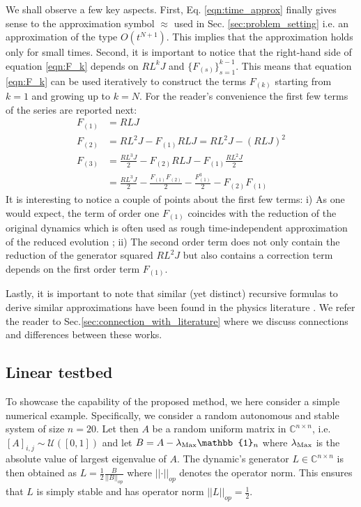 \documentclass[twocolumn]{autart}    %
\newcommand{\Uc}{\mathcal{U}}
\newcommand{\Cb}{\mathbb{C}}
\newcommand{\um}{\frac{1}{2}}
\newcommand{\one}{\mathbb{1}}
\newcommand{\norm}[1]{\left|\left| #1 \right|\right|}
\begin{document}
We shall observe a few key aspects. 
First, Eq. \eqref{eqn:time_approx} finally gives sense to the approximation symbol $\approx$ used in Sec. \ref{sec:problem_setting} i.e. an approximation of the type $O(t^{N+1})$. This implies that the approximation holds only for small times. 
Second, it is important to notice that the right-hand side of equation \eqref{eqn:F_k} depends on $RL^{k}J$ and $\{F_{(s)}\}_{s=1}^{k-1}$. This means that equation \eqref{eqn:F_k} can be used iteratively to construct the terms $F_{(k)}$ starting from $k=1$ and growing up to $k=N$. 
For the reader's convenience the first few terms of the series are reported next:
\begin{align*}
    F_{(1)} &= RLJ\\
    F_{(2)} &= RL^2J - F_{(1)}RLJ = RL^2J - (RLJ)^2\\
    F_{(3)} &= \frac{RL^3J}{2} - F_{(2)}RLJ - F_{(1)}\frac{RL^2J}{2} \\
    &= \frac{RL^3J}{2} - \frac{F_{(1)}F_{(2)}}{2} - \frac{F_{(1)}^3}{2} - F_{(2)}F_{(1)}
\end{align*}
It is interesting to notice a couple of points about the first few terms: i) As one would expect, the term of order one $F_{(1)}$ coincides with the reduction of the original dynamics which is often used as rough time-independent approximation of the reduced evolution \cite{antoulas}; ii) The second order term does not only contain the reduction of the generator squared $RL^2J$ but also contains a correction term depends on the first order term $F_{(1)}$.  


Lastly, it is important to note that similar (yet distinct) recursive formulas to derive similar approximations have been found in the physics literature \cite{nestmann2019time,cerrillo2014non,cygorek2025timenonlocalversustimelocallongtime,gasbarri2018recursive}.  We refer the reader to Sec.\ref{sec:connection_with_literature} where we discuss connections and differences between these works.

\subsection{Linear testbed}
\label{sec:linear_testbed}

To showcase the capability of the proposed method, we here consider a simple numerical example.  
Specifically, we consider a random autonomous and stable system of size $n=20$. 
Let then $A$ be a random uniform matrix in $\Cb^{n\times n}$, i.e. $[A]_{i,j}\sim\Uc([0,1])$ and let $B = A - \lambda_{\rm Max} \one_{n}$ where $\lambda_{\rm Max}$ is the absolute value of largest eigenvalue of $A$. 
The dynamic's generator $L\in\Cb^{n\times n}$ is then obtained as $L = \frac{1}{2}\frac{B}{\norm{B}_{op}}$ where $\norm{\cdot}_{op}$ denotes the operator norm.
This ensures that $L$ is simply stable and has operator norm $\norm{L}_{op}=\um$. 
\end{document}
